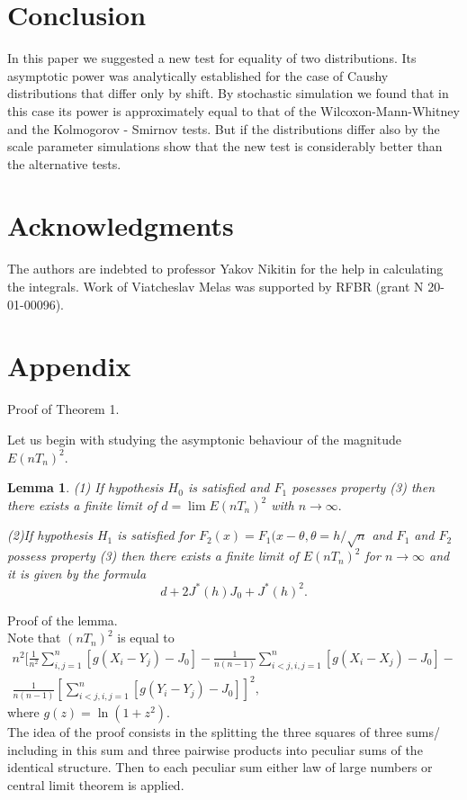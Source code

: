 \documentclass[final,11pt,3p]{elsarticle}
\newtheorem{lemma}{Lemma}
\begin{document}
\section{Conclusion}
In this paper we suggested a new test for equality of two distributions. Its asymptotic power was analytically established for the case of Caushy distributions that differ only by shift. By stochastic simulation we found that in this case its power is approximately equal to that of the Wilcoxon-Mann-Whitney and the
Kolmogorov - Smirnov tests. But if the distributions differ also by the scale parameter simulations show that the new test is considerably better than the alternative tests.

\section*{Acknowledgments}
The authors are indebted to professor
 Yakov Nikitin for the help in calculating the  integrals. Work of Viatcheslav Melas was supported by RFBR (grant N 20-01-00096).

\section{Appendix}
Proof of Theorem 1.

Let us begin with studying the asymptonic behaviour of the magnitude $E(nT_n)^2$.

\begin{lemma}
(1) If hypothesis $H_0$ is satisfied and $F_1$ posesses property (3) then there exists a finite  limit of $d=\lim E(nT_n)^2$ with $n \to \infty.$ 

(2)If hypothesis $H_1$ is satisfied for $F_2(x)= F_1(x-\theta,\theta= h/\sqrt{n}$ and $F_1$ and $F_2$ possess property (3)  then there exists a finite  limit of $E(nT_n)^2$ for $n \to \infty$ and it is given by the formula
$$
d + 2J^*(h)J_0 + J^*(h)^2.
$$
\end{lemma}
Proof of the lemma.\\
Note that $(nT_n)^2$ is equal to
\begin{eqnarray*}
n^2 [\frac{1}{n^2}\sum_{i,j=1}^n [g(X_i - Y_j)-J_0]-\frac{1}{ n(n-1)}\sum_{i<j,i,j=1}^n  [g(X_i - X_j)-J_0] - \\ \frac{1}{n(n-1)}[\sum_{i<j,i,j=1}^n  [g(Y_i - Y_j)-J_0]]^2,
\end{eqnarray*}
where $g(z)= \ln(1+z^2).$\\
The idea of the proof consists in the splitting the three squares of three sums/ including in this sum and three 
pairwise products into peculiar sums of the identical structure.
Then to each peculiar sum either law of large numbers or central limit theorem is applied.\\
\end{document}
